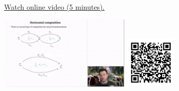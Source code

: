 
\begin{minipage}{10cm}
    \href{https://act4e-spring21.netlify.app/spring2021-nat-trafos:natural-trafos:horizontal-composition.html}{Watch online video (5 minutes).}
        
    \href{https://act4e-spring21.netlify.app/spring2021-nat-trafos:natural-trafos:horizontal-composition.html}{\includegraphics[height=3.5cm]{spring2021-nat-trafos:natural-trafos:horizontal-composition/thumbnails.jpg}}
    \href{https://act4e-spring21.netlify.app/spring2021-nat-trafos:natural-trafos:horizontal-composition.html}{\includegraphics[height=2.5cm]{spring2021-nat-trafos:natural-trafos:horizontal-composition/qrcode.png}}
\end{minipage}
